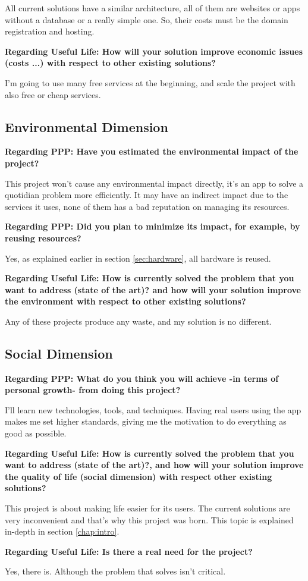 All current solutions have a similar architecture, all of them are websites or apps without a database or a really simple one.
So, their costs must be the domain registration and hosting.

\noindent \textbf{Regarding Useful Life: How will your solution improve economic issues (costs ...) with respect to other existing solutions?}

I'm going to use many free services at the beginning, and scale the project with also free or cheap services.

\subsection{Environmental Dimension}

\noindent \textbf{Regarding PPP: Have you estimated the environmental impact of the project?}

This project won't cause any environmental impact directly, it's an app to solve a quotidian problem more efficiently.
It may have an indirect impact due to the services it uses, none of them has a bad reputation on managing its resources.

\noindent \textbf{Regarding PPP: Did you plan to minimize its impact, for example, by reusing resources?}

Yes, as explained earlier in section \ref{sec:hardware}, all hardware is reused.

\noindent \textbf{Regarding Useful Life: How is currently solved the problem that you want to address (state of the art)? and how will your solution improve the environment with respect to other existing solutions?}

Any of these projects produce any waste, and my solution is no different.

\newpage
\subsection{Social Dimension}

\textbf{Regarding PPP: What do you think you will achieve -in terms of personal growth- from doing this project?}

I'll learn new technologies, tools, and techniques. Having real users using the app makes me set higher standards, giving me the motivation to do everything as good as possible.

\noindent \textbf{Regarding Useful Life: How is currently solved the problem that you want to address (state of the art)?, and how will your solution improve the quality of life (social dimension) with respect other existing solutions?}

This project is about making life easier for its users. The current solutions are very inconvenient and that's why this project was born. This topic is explained in-depth in section \ref{chap:intro}.

\noindent \textbf{Regarding Useful Life: Is there a real need for the project?}

Yes, there is. Although the problem that solves isn't critical.
